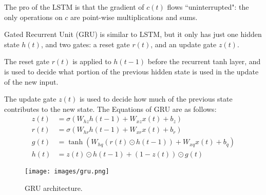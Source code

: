 \documentclass[oneside]{book}
\theoremstyle{definition}
\theoremstyle{plain}
\begin{document}
The pro of the LSTM is that the gradient of $c(t)$ flows ``uninterrupted": the only operations on $c$ are point-wise multiplications and sums.

Gated Recurrent Unit (GRU) is similar to LSTM, but it only has just one hidden state $h(t)$, and two gates: a reset gate $r(t)$, and an update gate $z(t)$.

The reset gate $r(t)$ is applied to $h(t-1)$ before the recurrent tanh layer, and is used to decide what portion of the previous hidden state is used in the update of the new input. 

The update gate $z(t)$ is used to decide how much of the previous state contributes to the new state. The Equations of GRU are as follows:
\begin{align*}
z(t) &= \sigma(W_{hz} h(t-1) + W_{xz} x(t) + b_z) \\
r(t) &= \sigma(W_{hr} h(t-1) + W_{xr} x(t) + b_r) \\
g(t) &= \tanh(W_{hq} (r(t) \odot h(t-1)) + W_{xq} x(t) + b_q) \\
h(t) &= z(t) \odot h(t-1) + (1 - z(t)) \odot g(t)
\end{align*}

\begin{figure}
    \centering
    \texttt{[image: images/gru.png]}
    \caption{GRU architecture.}
    \label{fig:gru}
\end{figure}
\end{document}
